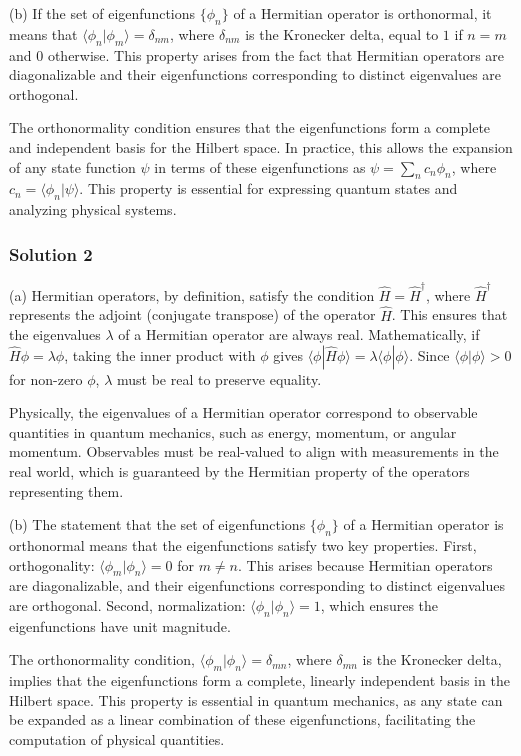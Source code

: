 \documentclass{article}
\begin{document}
(b) If the set of eigenfunctions $\{\phi_n\}$ of a Hermitian operator is orthonormal, it means that $\langle \phi_n | \phi_m \rangle = \delta_{nm}$, where $\delta_{nm}$ is the Kronecker delta, equal to $1$ if $n = m$ and $0$ otherwise. This property arises from the fact that Hermitian operators are diagonalizable and their eigenfunctions corresponding to distinct eigenvalues are orthogonal. 

The orthonormality condition ensures that the eigenfunctions form a complete and independent basis for the Hilbert space. In practice, this allows the expansion of any state function $\psi$ in terms of these eigenfunctions as $\psi = \sum_n c_n \phi_n$, where $c_n = \langle \phi_n | \psi \rangle$. This property is essential for expressing quantum states and analyzing physical systems.

\subsubsection{Solution 2}
(a) Hermitian operators, by definition, satisfy the condition $\hat{H} = \hat{H}^\dagger$, where $\hat{H}^\dagger$ represents the adjoint (conjugate transpose) of the operator $\hat{H}$. This ensures that the eigenvalues $\lambda$ of a Hermitian operator are always real. Mathematically, if $\hat{H} \phi = \lambda \phi$, taking the inner product with $\phi$ gives $\langle \phi | \hat{H} \phi \rangle = \lambda \langle \phi | \phi \rangle$. Since $\langle \phi | \phi \rangle > 0$ for non-zero $\phi$, $\lambda$ must be real to preserve equality. 

Physically, the eigenvalues of a Hermitian operator correspond to observable quantities in quantum mechanics, such as energy, momentum, or angular momentum. Observables must be real-valued to align with measurements in the real world, which is guaranteed by the Hermitian property of the operators representing them.

(b) The statement that the set of eigenfunctions $\{\phi_n\}$ of a Hermitian operator is orthonormal means that the eigenfunctions satisfy two key properties. First, orthogonality: $\langle \phi_m | \phi_n \rangle = 0$ for $m \neq n$. This arises because Hermitian operators are diagonalizable, and their eigenfunctions corresponding to distinct eigenvalues are orthogonal. Second, normalization: $\langle \phi_n | \phi_n \rangle = 1$, which ensures the eigenfunctions have unit magnitude. 

The orthonormality condition, $\langle \phi_m | \phi_n \rangle = \delta_{mn}$, where $\delta_{mn}$ is the Kronecker delta, implies that the eigenfunctions form a complete, linearly independent basis in the Hilbert space. This property is essential in quantum mechanics, as any state can be expanded as a linear combination of these eigenfunctions, facilitating the computation of physical quantities.
\end{document}
